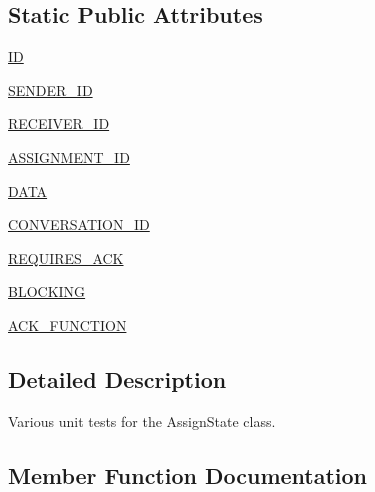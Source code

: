 \subsection*{Static Public Attributes}
\begin{DoxyCompactItemize}
\item 
\hyperlink{classparlai_1_1mturk_1_1core_1_1test_1_1test__socket__manager_1_1TestPacket_aa9a0cdbaf7edd7f80a816747c5d3f25b}{ID}
\item 
\hyperlink{classparlai_1_1mturk_1_1core_1_1test_1_1test__socket__manager_1_1TestPacket_a863d75a0446f6c3857c24dc072ee5ecc}{S\+E\+N\+D\+E\+R\+\_\+\+ID}
\item 
\hyperlink{classparlai_1_1mturk_1_1core_1_1test_1_1test__socket__manager_1_1TestPacket_a8320131823273b69a95abd1122278fc2}{R\+E\+C\+E\+I\+V\+E\+R\+\_\+\+ID}
\item 
\hyperlink{classparlai_1_1mturk_1_1core_1_1test_1_1test__socket__manager_1_1TestPacket_ab80ecda60182776d13494296d9602eca}{A\+S\+S\+I\+G\+N\+M\+E\+N\+T\+\_\+\+ID}
\item 
\hyperlink{classparlai_1_1mturk_1_1core_1_1test_1_1test__socket__manager_1_1TestPacket_a8baaaa8392c1de0b4e9776e5b17110fc}{D\+A\+TA}
\item 
\hyperlink{classparlai_1_1mturk_1_1core_1_1test_1_1test__socket__manager_1_1TestPacket_af357033fde89f3c44d04bd82c2ea0b9b}{C\+O\+N\+V\+E\+R\+S\+A\+T\+I\+O\+N\+\_\+\+ID}
\item 
\hyperlink{classparlai_1_1mturk_1_1core_1_1test_1_1test__socket__manager_1_1TestPacket_a086d5481be1dd3ef9a27bbb5b753a1ce}{R\+E\+Q\+U\+I\+R\+E\+S\+\_\+\+A\+CK}
\item 
\hyperlink{classparlai_1_1mturk_1_1core_1_1test_1_1test__socket__manager_1_1TestPacket_a2cae239fb50dcc34e325302fd85f3824}{B\+L\+O\+C\+K\+I\+NG}
\item 
\hyperlink{classparlai_1_1mturk_1_1core_1_1test_1_1test__socket__manager_1_1TestPacket_a8128dd7252762d1f74e0902606351428}{A\+C\+K\+\_\+\+F\+U\+N\+C\+T\+I\+ON}
\end{DoxyCompactItemize}


\subsection{Detailed Description}
\begin{DoxyVerb}Various unit tests for the AssignState class.
\end{DoxyVerb}
 

\subsection{Member Function Documentation}
\mbox{\label{classparlai_1_1mturk_1_1core_1_1test_1_1test__socket__manager_1_1TestPacket_ad224aba0d9065c397e84634f1aea3d1c}} 
